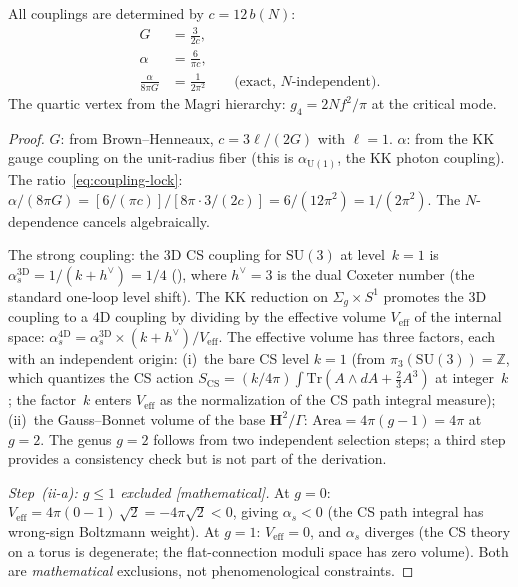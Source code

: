 \begin{proposition}
\label{prop:couplings}
All couplings are determined by $c = 12\,b(N)$:
\begin{align}
  G &= \frac{3}{2c}, \label{eq:newton}\\
  \alpha &= \frac{6}{\pi c}, \label{eq:alpha}\\
  \frac{\alpha}{8\pi G} &= \frac{1}{2\pi^2}
    \qquad\text{(exact, $N$-independent)}. \label{eq:coupling-lock}
\end{align}
The quartic vertex from the Magri hierarchy:
$g_4 = 2N f^2/\pi$ at the critical mode.
\end{proposition}

\begin{proof}
$G$: from Brown--Henneaux, $c = 3\ell/(2G)$ with $\ell = 1$.
$\alpha$: from the KK gauge coupling on the unit-radius fiber
(this is $\alpha_{\mathrm{U}(1)}$, the KK photon coupling).
The ratio~\eqref{eq:coupling-lock}: $\alpha/(8\pi G)
= [6/(\pi c)] / [8\pi \cdot 3/(2c)] = 6/(12\pi^2) = 1/(2\pi^2)$.
The $N$-dependence cancels algebraically.

The strong coupling: the $3$D CS coupling for $\mathrm{SU}(3)$
at level~$k = 1$ is $\alpha_s^{3\mathrm{D}} = 1/(k + h^\vee)
= 1/4$ (\citealt{Witten1989Jones}), where $h^\vee = 3$
is the dual Coxeter number (the standard one-loop level shift).
The KK reduction on $\Sigma_g \times S^1$ promotes the
$3$D coupling to a $4$D coupling by dividing by the
effective volume $V_{\mathrm{eff}}$ of the internal space:
$\alpha_s^{4\mathrm{D}}
= \alpha_s^{3\mathrm{D}} \times (k{+}h^\vee) / V_{\mathrm{eff}}$.
The effective volume has three factors, each with an
independent origin:
(i)~the bare CS level $k = 1$
(from $\pi_3(\mathrm{SU}(3)) = \mathbb{Z}$, which
quantizes the CS action $S_{\mathrm{CS}} = (k/4\pi)
\int\mathrm{Tr}(A \wedge dA + \tfrac{2}{3}A^3)$
at integer~$k$; the factor~$k$ enters $V_{\mathrm{eff}}$
as the normalization of the CS path integral measure);
(ii)~the Gauss--Bonnet volume of the base
$\mathbf{H}^2/\Gamma$:
$\mathrm{Area} = 4\pi(g{-}1) = 4\pi$ at $g = 2$.
The genus $g = 2$ follows from two independent
selection steps; a third step provides a consistency check
but is not part of the derivation.

\emph{Step~(ii-a): $g \le 1$ excluded [mathematical].}
At $g = 0$: $V_{\mathrm{eff}} = 4\pi(0{-}1)\,\sqrt{2}
= -4\pi\sqrt{2} < 0$, giving $\alpha_s < 0$
(the CS path integral has wrong-sign Boltzmann weight).
At $g = 1$: $V_{\mathrm{eff}} = 0$, and $\alpha_s$ diverges
(the CS theory on a torus is degenerate; the flat-connection
moduli space has zero volume).
Both are \emph{mathematical} exclusions,
not phenomenological constraints.


\end{proof}
